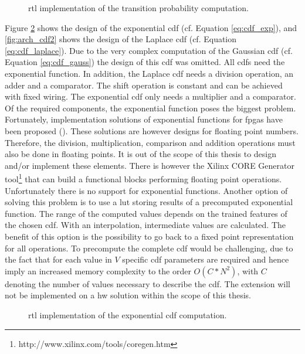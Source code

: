 \documentclass[mscthesis]{usiinfthesis}
\begin{document}
\begin{figure}
    \centering
    
    \caption{\acrshort{rtl} implementation of the transition probability
        computation.}
    \label{fig:arch_ext}
\end{figure}

Figure \ref{fig:arch_cdf1} shows the design of the exponential \gls{cdf} (cf.
Equation \ref{eq:cdf_exp}), and \ref{fig:arch_cdf2} shows the design of the
Laplace \gls{cdf} (cf. Equation \ref{eq:cdf_laplace}). Due to the very complex
computation of the Gaussian \gls{cdf} (cf. Equation \ref{eq:cdf_gauss}) the
design of this \gls{cdf} was omitted. All \glspl{cdf} need the exponential
function. In addition, the Laplace \gls{cdf} needs a division operation, an
adder and a comparator. The shift operation is constant and can be achieved
with fixed wiring. The exponential \gls{cdf} only needs a multiplier and
a comparator. Of the required components, the exponential function poses the
biggest problem. Fortunately, implementation solutions of exponential functions
for \glspl{fpga} have been proposed (\cite{RSSI08_Pottathuparambil,
ICFPT05_Detrey}). These solutions are however designs for floating point
numbers. Therefore, the division, multiplication, comparison and addition
operations must also be done in floating points. It is out of the scope of this
thesis to design and/or implement these elements. There is however the Xilinx
CORE Generator tool\footnote{http://www.xilinx.com/tools/coregen.htm} that can
build a functional blocks performing floating point operations.  Unfortunately
there is no support for exponential functions. Another option of solving this
problem is to use a \gls{lut} storing results of a precomputed exponential
function. The range of the computed values depends on the trained features of
the chosen \gls{cdf}. With an interpolation, intermediate values are
calculated. The benefit of this option is the possibility to go back to a fixed
point representation for all operations. To precompute the complete \gls{cdf}
would be challenging, due to the fact that for each value in $V$ specific
\gls{cdf} parameters are required and hence imply an increased memory
complexity to the order $O(C*N^2)$, with $C$ denoting the number of values
necessary to describe the \gls{cdf}. The extension will not be implemented on
a \gls{hw} solution within the scope of this thesis.

\begin{figure}
    \centering
    
    \caption{\acrshort{rtl} implementation of the exponential \acrshort{cdf}
        computation.}
    \label{fig:arch_cdf1}
\end{figure}
\end{document}
